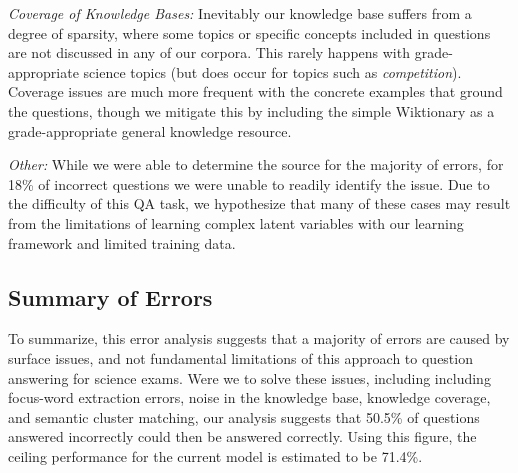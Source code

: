 {\flushleft \emph{Coverage of Knowledge Bases: }}
Inevitably our knowledge base suffers from a degree of sparsity, where some topics or specific concepts included in questions are not discussed in any of our corpora.  This rarely happens with grade-appropriate science topics (but does occur for topics such as \emph{competition}).  Coverage issues are much more frequent with the concrete examples that ground the questions, though we  mitigate this by including the simple Wiktionary as a grade-appropriate general knowledge resource.

{\flushleft \emph{Other: }}
While we were able to determine the source for the majority of errors, for 18\% of incorrect questions we were unable to readily identify the issue.  Due to the difficulty of this QA task, we hypothesize that many of these cases may result from the limitations of learning complex latent variables with our learning framework and limited training data. 



\subsection{Summary of Errors}

To summarize, this error analysis suggests that a majority of errors are caused by surface issues, and not fundamental limitations of this approach to question answering for science exams.  Were we to solve these issues, including including focus-word extraction errors, noise in the knowledge base, knowledge coverage, and semantic cluster matching, our analysis suggests that 50.5\% of questions answered incorrectly could then be answered correctly.  Using this figure, the ceiling performance for the current model is estimated to be 71.4\%. 


